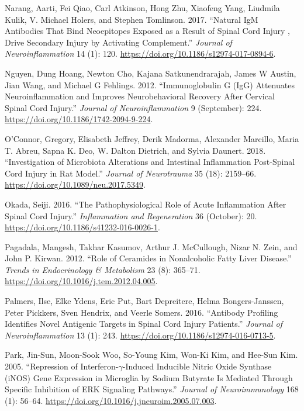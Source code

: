 \documentclass[9pt,lineno]{elife}
\newlength{\cslhangindent}
\newlength{\cslentryspacingunit} %
\newenvironment{CSLReferences}[2] %
 {%
  \setlength{\parindent}{0pt}
  \ifodd #1
  \let\oldpar\par
  \def\par{\hangindent=\cslhangindent\oldpar}
  \fi
  \setlength{\parskip}{#2\cslentryspacingunit}
 }%
 {}
\begin{document}
\begin{landscape}
\begin{landscape}
\begin{landscape}
\begin{landscape}
\begin{CSLReferences}{1}{0}
\leavevmode{}%
Narang, Aarti, Fei Qiao, Carl Atkinson, Hong Zhu, Xiaofeng Yang, Liudmila Kulik, V. Michael Holers, and Stephen Tomlinson. 2017. {``Natural {IgM} Antibodies That Bind Neoepitopes Exposed as a Result of Spinal Cord Injury , Drive Secondary Injury by Activating Complement.''} \emph{Journal of Neuroinflammation} 14 (1): 120. \url{https://doi.org/10.1186/s12974-017-0894-6}.

\leavevmode{}%
Nguyen, Dung Hoang, Newton Cho, Kajana Satkunendrarajah, James W Austin, Jian Wang, and Michael G Fehlings. 2012. {``Immunoglobulin {G} ({IgG}) Attenuates Neuroinflammation and Improves Neurobehavioral Recovery After Cervical Spinal Cord Injury.''} \emph{Journal of Neuroinflammation} 9 (September): 224. \url{https://doi.org/10.1186/1742-2094-9-224}.

\leavevmode{}%
O'Connor, Gregory, Elisabeth Jeffrey, Derik Madorma, Alexander Marcillo, Maria T. Abreu, Sapna K. Deo, W. Dalton Dietrich, and Sylvia Daunert. 2018. {``Investigation of {Microbiota Alterations} and {Intestinal Inflammation Post-Spinal Cord Injury} in {Rat Model}.''} \emph{Journal of Neurotrauma} 35 (18): 2159--66. \url{https://doi.org/10.1089/neu.2017.5349}.

\leavevmode{}%
Okada, Seiji. 2016. {``The Pathophysiological Role of Acute Inflammation After Spinal Cord Injury.''} \emph{Inflammation and Regeneration} 36 (October): 20. \url{https://doi.org/10.1186/s41232-016-0026-1}.

\leavevmode{}%
Pagadala, Mangesh, Takhar Kasumov, Arthur J. McCullough, Nizar N. Zein, and John P. Kirwan. 2012. {``Role of Ceramides in Nonalcoholic Fatty Liver Disease.''} \emph{Trends in Endocrinology \& Metabolism} 23 (8): 365--71. \url{https://doi.org/10.1016/j.tem.2012.04.005}.

\leavevmode{}%
Palmers, Ilse, Elke Ydens, Eric Put, Bart Depreitere, Helma Bongers-Janssen, Peter Pickkers, Sven Hendrix, and Veerle Somers. 2016. {``Antibody Profiling Identifies Novel Antigenic Targets in Spinal Cord Injury Patients.''} \emph{Journal of Neuroinflammation} 13 (1): 243. \url{https://doi.org/10.1186/s12974-016-0713-5}.

\leavevmode{}%
Park, Jin-Sun, Moon-Sook Woo, So-Young Kim, Won-Ki Kim, and Hee-Sun Kim. 2005. {``Repression of Interferon-{\(\gamma\)}-Induced Inducible Nitric Oxide Synthase ({iNOS}) Gene Expression in Microglia by Sodium Butyrate Is Mediated Through Specific Inhibition of {ERK} Signaling Pathways.''} \emph{Journal of Neuroimmunology} 168 (1): 56--64. \url{https://doi.org/10.1016/j.jneuroim.2005.07.003}.


\end{CSLReferences}
\end{landscape}
\end{landscape}
\end{landscape}
\end{landscape}
\end{document}
